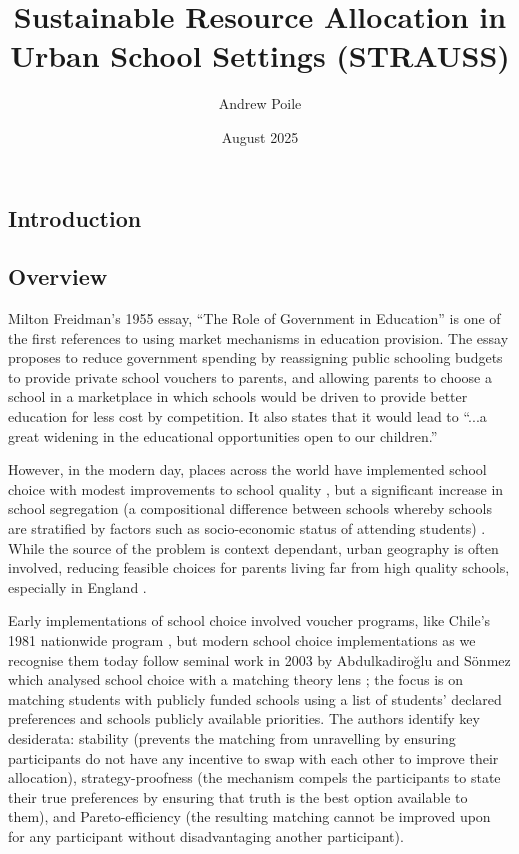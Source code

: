 \documentclass{article}
\title{Sustainable Resource Allocation in Urban School Settings (STRAUSS)}
\author{Andrew Poile}
\date{August 2025}
\begin{document}
\maketitle

\begin{multicols}{2}
\section{Introduction}
\subsection{Overview}
Milton Freidman's 1955 essay, \enquote{The Role of Government in Education} \cite{friedmanRoleGovernmentEducation1955} is one of the first references to using market mechanisms in education provision. The essay proposes to reduce government spending by reassigning public schooling budgets to provide private school vouchers to parents, and allowing parents to choose a school in a marketplace in which schools would be driven to provide better education for less cost by competition. It also states that it would lead to \enquote{...a great widening in the educational opportunities open to our children.}

However, in the modern day, places across the world have implemented school choice with modest improvements to school quality \cite{gibbonsChoiceCompetitionPupil2008,hsiehEffectsGeneralizedSchool2006,gleasonEvaluationCharterSchool,eppleSchoolVouchersSurvey2017,quintero-fragozoEffectsSpatialCompetition2023}, but a significant increase in school segregation (a compositional difference between schools whereby schools are stratified by factors such as socio-economic status of attending students) \cite{wilsonSchoolChoiceCity2019}. While the source of the problem is context dependant, urban geography is often involved, reducing feasible choices for parents living far from high quality schools, especially in England \cite{burgessParentalChoicePrimary2011a,burgessSchoolChoiceEngland2019}.

Early implementations of school choice involved voucher programs, like Chile's 1981 nationwide program \cite{hsiehEffectsGeneralizedSchool2006}, but modern school choice implementations as we recognise them today follow seminal work in 2003 by Abdulkadiroğlu and Sönmez which analysed school choice with a matching theory lens \cite{abdulkadirogluSchoolChoiceMechanism2003}; the focus is on matching students with publicly funded schools using a list of students' declared preferences and schools publicly available priorities. The authors identify key desiderata: stability (prevents the matching from unravelling by ensuring participants do not have any incentive to swap with each other to improve their allocation), strategy-proofness (the mechanism compels the participants to state their true preferences by ensuring that truth is the best option available to them), and Pareto-efficiency (the resulting matching cannot be improved upon for any participant without disadvantaging another participant).


\end{multicols}
\end{document}
